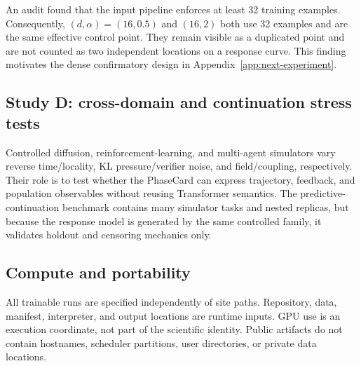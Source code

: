 An audit found that the input pipeline enforces at least 32 training examples.
Consequently, $(d,\alpha)=(16,0.5)$ and $(16,2)$ both use 32 examples and are
the same effective control point. They remain visible as a duplicated point and
are not counted as two independent locations on a response curve. This finding
motivates the dense confirmatory design in Appendix~\ref{app:next-experiment}.

\subsection{Study D: cross-domain and continuation stress tests}

Controlled diffusion, reinforcement-learning, and multi-agent simulators vary
reverse time/locality, KL pressure/verifier noise, and field/coupling,
respectively. Their role is to test whether the PhaseCard can express
trajectory, feedback, and population observables without reusing Transformer
semantics. The predictive-continuation benchmark contains many simulator tasks
and nested replicas, but because the response model is generated by the same
controlled family, it validates holdout and censoring mechanics only.

\subsection{Compute and portability}

All trainable runs are specified independently of site paths. Repository, data,
manifest, interpreter, and output locations are runtime inputs. GPU use is an
execution coordinate, not part of the scientific identity. Public artifacts do
not contain hostnames, scheduler partitions, user directories, or private data
locations.

\FloatBarrier
